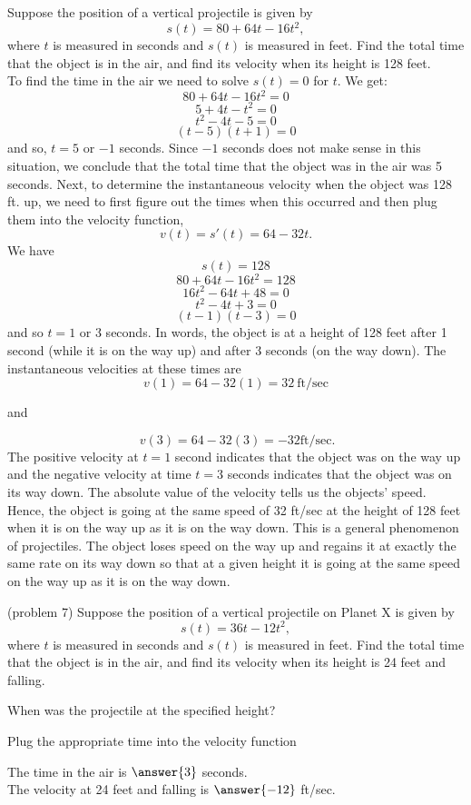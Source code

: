 \documentclass[handout]{ximera}
\begin{document}
\begin{example}[example 7]
Suppose the position of a vertical projectile is given by 
\[s(t) = 80 + 64t-16t^2, \]
where $t$ is measured in seconds and $s(t)$ is measured in feet. 
Find the total time that the object is in the air, and find its velocity when its height is 128 feet.\\
 
To find the time in the air we need to solve $s(t) = 0$ for $t$. We get:
\[80 + 64t-16t^2 = 0\]
\[5 + 4t-t^2 = 0\]
\[t^2 -4t -5  = 0\]
\[(t-5)(t+1)  = 0\]
and so, $t =  5$ or $-1$ seconds. Since $-1$ seconds does not make sense in this situation, we conclude that
the total time that the object was in the air was 5 seconds.
Next, to determine the instantaneous velocity when the object was 128 ft. up, 
we need to first figure out the times when this occurred and then plug them into the velocity function, 
\[v(t) = s'(t) = 64 - 32t.\]
We have
\[s(t) = 128 \]
\[80 + 64t -16t^2 = 128\]
\[  16t^2 - 64t + 48 = 0\]
\[  t^2 - 4t + 3 = 0\]
\[  (t-1)(t-3) = 0\]
and so $t= 1$ or $3$ seconds.
In words, the object is at a height of 128 feet after 1 second (while it is on the way up) and after 3 seconds (on the way down).
The instantaneous velocities at these times are
\[v(1) = 64 - 32(1) = 32 \ \text{ft/sec}\]
\begin{center}
  and
\end{center}
\[ \ v(3) = 64 - 32(3) = -32 \text{ft/sec.}\]
The positive velocity at $t= 1$ second indicates that the object was on the way up and the negative velocity 
at time $t=3$ seconds indicates 
that the object was on its way down.  The absolute value of the velocity tells us the objects' speed. 
Hence, the object is going at the same speed of 32 ft/sec at the height of 128 feet when it is on the way up as it 
is on the way down.
This is a general phenomenon of projectiles. The object loses speed on the way up and 
regains it at exactly the same rate on its way down so that at a given height it is going at the same 
speed on the way up as it is on the way down.
\end{example}


\begin{problem}(problem 7)
Suppose the position of a vertical projectile on Planet X is given by 
\[s(t) = 36t - 12t^2, \]
where $t$ is measured in seconds and $s(t)$ is measured in feet. 
Find the total time that the object is in the air, and find its velocity when its height is 24 feet and falling.
\begin{hint}
When was the projectile at the specified height?
\end{hint}
\begin{hint}
Plug the appropriate time into the velocity function
\end{hint}

The time in the air is $\answer{3}$ seconds.\\
The velocity at 24 feet and falling is $\answer{-12}$ ft/sec.

\end{problem}
\end{document}
